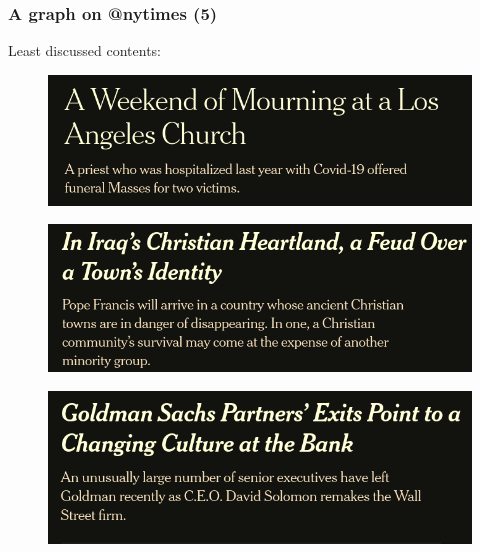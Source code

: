 \documentclass{beamer}
\begin{document}
\begin{frame}[c]
    \frametitle{A graph on @nytimes (5)}

    Least discussed contents:

    \begin{figure}[htpb]
        \centering
        \includegraphics[width=0.5\linewidth]{img/ndiscussed1.png}
    \end{figure}

    \begin{figure}[htpb]
        \centering
        \includegraphics[width=0.5\linewidth]{img/ndiscussed2.png}
    \end{figure}

    \begin{figure}[htpb]
        \centering
        \includegraphics[width=0.5\linewidth]{img/ndiscussed3.png}
    \end{figure}

\end{frame}
\end{document}
